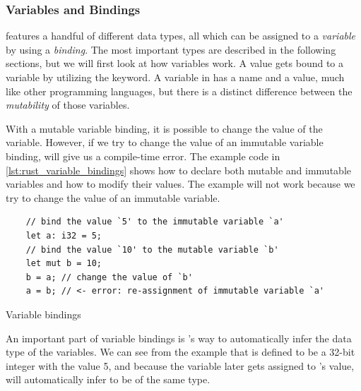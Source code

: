 


\subsubsection{Variables and Bindings}

{\rust} features a handful of different data types, all which can be assigned to a \emph{variable} by using a \emph{binding}.
The most important types are described in the following sections, but we will first look at how variables work.
A value gets bound to a variable by utilizing the  keyword.
A variable in {\rust} has a name and a value, much like other programming languages, but there is a distinct difference between the \emph{mutability} of those variables.

With a mutable variable binding, it is possible to change the value of the variable.
However, if we try to change the value of an immutable variable binding, {\rust} will give us a compile-time error.
The example code in \autoref{lst:rust_variable_bindings} shows how to declare both mutable and immutable variables and how to modify their values.
The example will not work because we try to change the value of an immutable variable.

\begin{listing}[H]
  \begin{verbatim}
    // bind the value `5' to the immutable variable `a'
    let a: i32 = 5;
    // bind the value `10' to the mutable variable `b'
    let mut b = 10;
    b = a; // change the value of `b'
    a = b; // <- error: re-assignment of immutable variable `a'
  \end{verbatim}
  \caption{Variable bindings}
  \label{lst:rust_variable_bindings}
\end{listing}

An important part of variable bindings is {\rust}'s way to automatically infer the data type of the variables.
We can see from the example that  is defined to be a 32-bit integer with the value 5, and because the variable  later gets assigned to 's value, {\rust} will automatically infer  to be of the same type.

